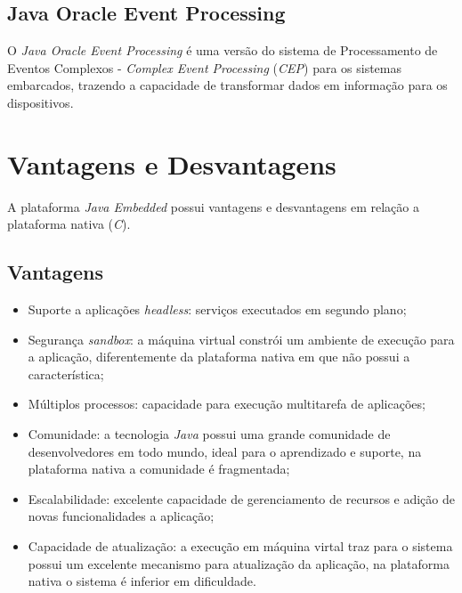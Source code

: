 \subsection{Java Oracle Event Processing}

O \textit{Java Oracle Event Processing} é uma versão do sistema de
Processamento de Eventos Complexos - \textit{Complex Event Processing}
(\textit{CEP}) para os sistemas embarcados, trazendo a capacidade de
transformar dados em informação para os dispositivos.

\section{Vantagens e Desvantagens}

A plataforma \textit{Java Embedded} possui vantagens e desvantagens em relação 
a plataforma nativa (\textit{C}).

\subsection{Vantagens}

\begin{itemize}
    
	\item Suporte a aplicações \textit{headless}: serviços executados em 
	segundo plano;
    
	\item Segurança \textit{sandbox}: a máquina virtual constrói um ambiente de 
	execução para a aplicação, diferentemente da plataforma nativa em que não 
	possui a característica;
    
	\item Múltiplos processos: capacidade para execução multitarefa de 
	aplicações;
    
	\item Comunidade: a tecnologia \textit{Java} possui uma grande comunidade 
	de desenvolvedores em todo mundo, ideal para o aprendizado e suporte, na 
	plataforma nativa a comunidade é fragmentada;
    
	\item Escalabilidade: excelente capacidade de gerenciamento de recursos e 
	adição de novas funcionalidades a aplicação;
    
	\item Capacidade de atualização: a execução em máquina virtal traz para o 
	sistema possui um excelente mecanismo para atualização da aplicação, na 
	plataforma nativa o sistema é inferior em dificuldade.
    
\end{itemize}


